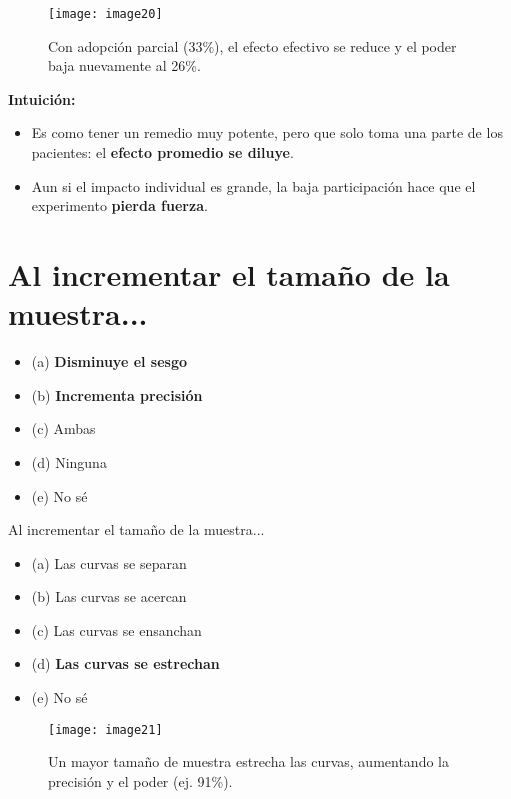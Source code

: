\documentclass[12pt]{article}
\begin{document}
\begin{figure}[H]
    \centering
    \texttt{[image: image20]}
    \caption{\footnotesize Con adopción parcial (33\%), el efecto efectivo se reduce y el poder baja nuevamente al 26\%.}
\end{figure}

\textbf{Intuición:}
\begin{itemize}
    \item Es como tener un remedio muy potente, pero que solo toma una parte de los pacientes: el \textbf{efecto promedio se diluye}.
    \item Aun si el impacto individual es grande, la baja participación hace que el experimento \textbf{pierda fuerza}.
\end{itemize}

\section*{\noindent\textbf{Al incrementar el tamaño de la muestra...}}

\begin{itemize}
    \item (a) \textbf{Disminuye el sesgo}
    \item (b) \textbf{Incrementa precisión}
    \item (c) Ambas
    \item (d) Ninguna
    \item (e) No sé
\end{itemize}

\noindent Al incrementar el tamaño de la muestra...
\begin{itemize}
    \item (a) Las curvas se separan
    \item (b) Las curvas se acercan
    \item (c) Las curvas se ensanchan
    \item (d) \textbf{Las curvas se estrechan}
    \item (e) No sé
\end{itemize}

\begin{figure}[H]
    \centering
    \texttt{[image: image21]}
    \caption{\footnotesize Un mayor tamaño de muestra estrecha las curvas, aumentando la precisión y el poder (ej. 91\%).}
\end{figure}
\end{document}
